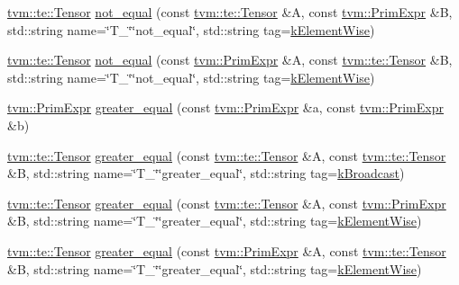 \begin{DoxyCompactItemize}
\hyperlink{classtvm_1_1te_1_1Tensor}{tvm\+::te\+::\+Tensor} \hyperlink{namespacetopi_af9d75d4f33a429452fc55d34163e2c15}{not\+\_\+equal} (const \hyperlink{classtvm_1_1te_1_1Tensor}{tvm\+::te\+::\+Tensor} \&A, const \hyperlink{classtvm_1_1PrimExpr}{tvm\+::\+Prim\+Expr} \&B, std\+::string name=\char`\"{}T\+\_\+\char`\"{}\char`\"{}not\+\_\+equal\char`\"{}, std\+::string tag=\hyperlink{namespacetopi_ac1b34ed59d38a5f5338bee6b2cad42be}{k\+Element\+Wise})
\item 
\hyperlink{classtvm_1_1te_1_1Tensor}{tvm\+::te\+::\+Tensor} \hyperlink{namespacetopi_a0042af518f55a13e0c08b6eef85ec477}{not\+\_\+equal} (const \hyperlink{classtvm_1_1PrimExpr}{tvm\+::\+Prim\+Expr} \&A, const \hyperlink{classtvm_1_1te_1_1Tensor}{tvm\+::te\+::\+Tensor} \&B, std\+::string name=\char`\"{}T\+\_\+\char`\"{}\char`\"{}not\+\_\+equal\char`\"{}, std\+::string tag=\hyperlink{namespacetopi_ac1b34ed59d38a5f5338bee6b2cad42be}{k\+Element\+Wise})
\item 
\hyperlink{classtvm_1_1PrimExpr}{tvm\+::\+Prim\+Expr} \hyperlink{namespacetopi_a1b031e71272376edbdde858787b91b34}{greater\+\_\+equal} (const \hyperlink{classtvm_1_1PrimExpr}{tvm\+::\+Prim\+Expr} \&a, const \hyperlink{classtvm_1_1PrimExpr}{tvm\+::\+Prim\+Expr} \&b)
\item 
\hyperlink{classtvm_1_1te_1_1Tensor}{tvm\+::te\+::\+Tensor} \hyperlink{namespacetopi_af041ca602856c6fee22f5cc03add4f00}{greater\+\_\+equal} (const \hyperlink{classtvm_1_1te_1_1Tensor}{tvm\+::te\+::\+Tensor} \&A, const \hyperlink{classtvm_1_1te_1_1Tensor}{tvm\+::te\+::\+Tensor} \&B, std\+::string name=\char`\"{}T\+\_\+\char`\"{}\char`\"{}greater\+\_\+equal\char`\"{}, std\+::string tag=\hyperlink{namespacetopi_a794b9155e9ba9d1c9c42a1cff1fb645f}{k\+Broadcast})
\item 
\hyperlink{classtvm_1_1te_1_1Tensor}{tvm\+::te\+::\+Tensor} \hyperlink{namespacetopi_a7bae0803e356e565dfc1edf049748172}{greater\+\_\+equal} (const \hyperlink{classtvm_1_1te_1_1Tensor}{tvm\+::te\+::\+Tensor} \&A, const \hyperlink{classtvm_1_1PrimExpr}{tvm\+::\+Prim\+Expr} \&B, std\+::string name=\char`\"{}T\+\_\+\char`\"{}\char`\"{}greater\+\_\+equal\char`\"{}, std\+::string tag=\hyperlink{namespacetopi_ac1b34ed59d38a5f5338bee6b2cad42be}{k\+Element\+Wise})
\item 
\hyperlink{classtvm_1_1te_1_1Tensor}{tvm\+::te\+::\+Tensor} \hyperlink{namespacetopi_a4c9cd0d863c5d4cc9905deac1898164f}{greater\+\_\+equal} (const \hyperlink{classtvm_1_1PrimExpr}{tvm\+::\+Prim\+Expr} \&A, const \hyperlink{classtvm_1_1te_1_1Tensor}{tvm\+::te\+::\+Tensor} \&B, std\+::string name=\char`\"{}T\+\_\+\char`\"{}\char`\"{}greater\+\_\+equal\char`\"{}, std\+::string tag=\hyperlink{namespacetopi_ac1b34ed59d38a5f5338bee6b2cad42be}{k\+Element\+Wise})

\end{DoxyCompactItemize}
